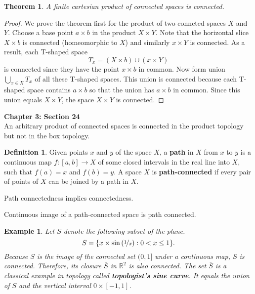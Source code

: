 \documentclass{article}
\newtheorem{theorem}{Theorem}
\newtheorem*{example}{Example}
\theoremstyle{definition}
\newtheorem{definition}{Definition}[section]
\theoremstyle{remark}
\begin{document}
    \begin{theorem}
        A finite cartesian product of connected spaces is connected.
    \end{theorem}
    \begin{proof}
        We prove the theorem first for the product of two conncted spaces $X$ and $Y$. Choose a base point $a\times b$ in the product
        $X\times Y$. Note that the horizontal slice $X\times b$ is connected (homeomorphic to $X$) and similarly $x\times Y$ is
        connected. As a result, each T-shaped space
        \[ T_x = (X\times b) \cup (x\times Y) \]
        is connected since they have the point $x\times b$ in common. Now form union $\bigcup_{x\in X} T_x$ of all these
        T-shaped spaces. This union is connected because each T-shaped space contains $a\times b$ so that the union has
        $a\times b$ in common. Since this union equals $X\times Y$, the space $X\times Y$ is connected.
    \end{proof}

    \newpage

    \textbf{Chapter 3: Section 24}\\

    An arbitrary product of connected spaces is connected in the product topology but not in the box topology.

    \begin{definition}
        Given points $x$ and $y$ of the space $X$, a \textbf{path} in $X$ from $x$ to $y$ is a continuous map $f:[a,b]\to X$ of some
        closed intervals in the real line into $X$, such that $f(a) = x$ and $f(b) = y$. A space $X$ is \textbf{path-connected} if
        every pair of points of $X$ can be joined by a path in $X$.
    \end{definition}

    Path connectedness implies connectedness.

    Continuous image of a path-connected space is path connected.

    \begin{example}
        Let $S$ denote the following subset of the plane.
        \[ S = \{x\times \sin{(\nicefrac{1}{x})}: 0<x\leq 1\}. \]
        Because $S$ is the image of the connected set $(0,1]$ under a continuous map, $S$ is connected. Therefore, its closure
        $\overline{S}$ in $\mathbb{R}^2$ is also connected. The set $\overline{S}$ is a classical example in topology called
        \textbf{topologist's sine curve}. It equals the union of $S$ and the vertical interval $0\times [-1,1]$.
    \end{example}
\end{document}
